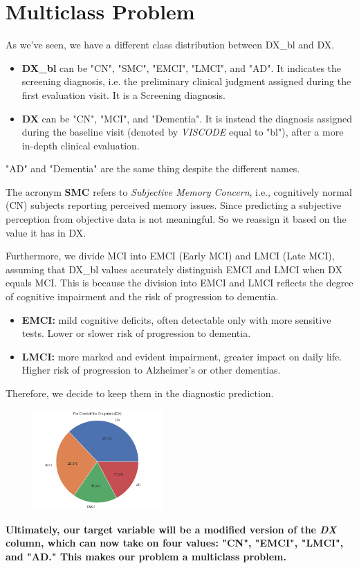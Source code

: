\section{Multiclass Problem}
As we've seen, we have a different class distribution between DX\_bl and DX.
\begin{itemize}
	\item \textbf{DX\_bl} can be "CN", "SMC", "EMCI", "LMCI", and "AD". It indicates the screening diagnosis, i.e. the preliminary clinical judgment assigned during the first evaluation visit. It is a Screening diagnosis.
	\item \textbf{DX} can be "CN", "MCI", and "Dementia". It is instead the diagnosis assigned during the baseline visit (denoted by \textit{VISCODE} equal to "bl"), after a more in-depth clinical evaluation. 
\end{itemize}
"AD" and "Dementia" are the same thing despite the different names.

The acronym \textbf{SMC} refers to \textit{Subjective Memory Concern}, i.e., cognitively normal (CN) subjects reporting perceived memory issues. Since predicting a subjective perception from objective data is not meaningful. So we reassign it based on the value it has in DX.

Furthermore, we divide MCI into EMCI (Early MCI) and LMCI (Late MCI), assuming that DX\_bl values accurately distinguish EMCI and LMCI when DX equals MCI. This is because the division into EMCI and LMCI reflects the degree of cognitive impairment and the risk of progression to dementia.
\begin{itemize}
	\item \textbf{EMCI:} mild cognitive deficits, often detectable only with more sensitive tests. Lower or slower risk of progression to dementia.
	\item \textbf{LMCI:} more marked and evident impairment, greater impact on daily life. Higher risk of progression to Alzheimer's or other dementias.
\end{itemize}
Therefore, we decide to keep them in the diagnostic prediction.

\begin{figure}[H]
	\centering
	\includegraphics[width=0.444\textwidth]{images/DX_pie_chart.png}
	\label{fig:pie-chart-dx}
\end{figure}

\textbf{Ultimately, our target variable will be a modified version of the \textit{DX} column, which can now take on four values: "CN", "EMCI", "LMCI", and "AD." This makes our problem a multiclass problem.}


